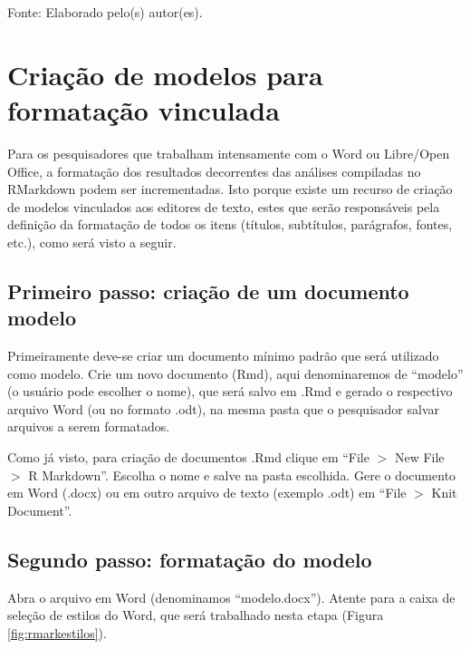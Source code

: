 \documentclass[12pt,brazil,oneside]{book}
\begin{document}
Fonte: Elaborado pelo(s) autor(es).

\hypertarget{criacao-de-modelos-para-formatacao-vinculada}{%
\section{Criação de modelos para formatação vinculada}\label{criacao-de-modelos-para-formatacao-vinculada}}

Para os pesquisadores que trabalham intensamente com o Word ou Libre/Open Office, a formatação dos resultados decorrentes das análises compiladas no RMarkdown podem ser incrementadas. Isto porque existe um recurso de criação de modelos vinculados aos editores de texto, estes que serão responsáveis pela definição da formatação de todos os itens (títulos, subtítulos, parágrafos, fontes, etc.), como será visto a seguir.

\hypertarget{primeiro-passo-criacao-de-um-documento-modelo}{%
\subsection{Primeiro passo: criação de um documento modelo}\label{primeiro-passo-criacao-de-um-documento-modelo}}

Primeiramente deve-se criar um documento mínimo padrão que será utilizado como modelo. Crie um novo documento (Rmd), aqui denominaremos de ``modelo'' (o usuário pode escolher o nome), que será salvo em .Rmd e gerado o respectivo arquivo Word (ou no formato .odt), na mesma pasta que o pesquisador salvar arquivos a serem formatados.

Como já visto, para criação de documentos .Rmd clique em ``File \(>\) New File \(>\) R Markdown''. Escolha o nome e salve na pasta escolhida. Gere o documento em Word (.docx) ou em outro arquivo de texto (exemplo .odt) em ``File \(>\) Knit Document''.

\hypertarget{segundo-passo-formatacao-do-modelo}{%
\subsection{Segundo passo: formatação do modelo}\label{segundo-passo-formatacao-do-modelo}}

Abra o arquivo em Word (denominamos ``modelo.docx''). Atente para a caixa de seleção de estilos do Word, que será trabalhado nesta etapa (Figura \ref{fig:rmarkestilos}).
\end{document}
